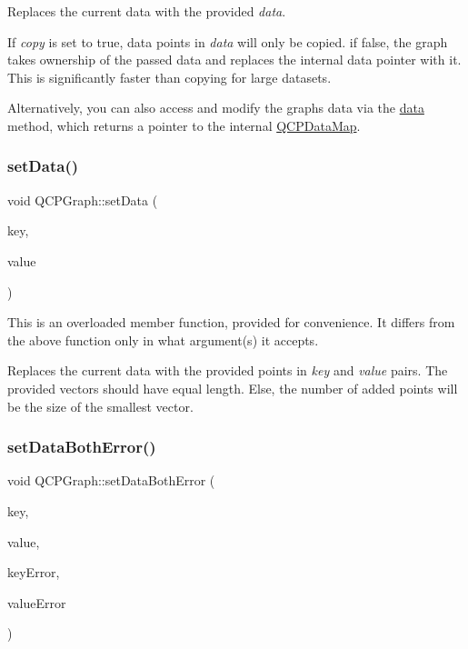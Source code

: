 Replaces the current data with the provided {\itshape data}.

If {\itshape copy} is set to true, data points in {\itshape data} will only be copied. if false, the graph takes ownership of the passed data and replaces the internal data pointer with it. This is significantly faster than copying for large datasets.

Alternatively, you can also access and modify the graph\textquotesingle{}s data via the \hyperlink{class_q_c_p_graph_acde1c0d1f6a817930489548396e6b3e6}{data} method, which returns a pointer to the internal \hyperlink{qcustomplot_8h_a84a9c4a4c2216ccfdcb5f3067cda76e3}{Q\+C\+P\+Data\+Map}. \hypertarget{class_q_c_p_graph_a4c55d8ac13bfa42c8c93747820891a76}{}\label{class_q_c_p_graph_a4c55d8ac13bfa42c8c93747820891a76} 
\subsubsection{\texorpdfstring{set\+Data()}{setData()}\hspace{0.1cm}{\footnotesize\ttfamily [2/2]}}
{\footnotesize\ttfamily void Q\+C\+P\+Graph\+::set\+Data (\begin{DoxyParamCaption}\item[{const Q\+Vector$<$ double $>$ \&}]{key,  }\item[{const Q\+Vector$<$ double $>$ \&}]{value }\end{DoxyParamCaption})}

This is an overloaded member function, provided for convenience. It differs from the above function only in what argument(s) it accepts.

Replaces the current data with the provided points in {\itshape key} and {\itshape value} pairs. The provided vectors should have equal length. Else, the number of added points will be the size of the smallest vector. \hypertarget{class_q_c_p_graph_a873fe46bdb20be5710428e474ade8908}{}\label{class_q_c_p_graph_a873fe46bdb20be5710428e474ade8908} 
\subsubsection{\texorpdfstring{set\+Data\+Both\+Error()}{setDataBothError()}\hspace{0.1cm}{\footnotesize\ttfamily [1/2]}}
{\footnotesize\ttfamily void Q\+C\+P\+Graph\+::set\+Data\+Both\+Error (\begin{DoxyParamCaption}\item[{const Q\+Vector$<$ double $>$ \&}]{key,  }\item[{const Q\+Vector$<$ double $>$ \&}]{value,  }\item[{const Q\+Vector$<$ double $>$ \&}]{key\+Error,  }\item[{const Q\+Vector$<$ double $>$ \&}]{value\+Error }\end{DoxyParamCaption})}

